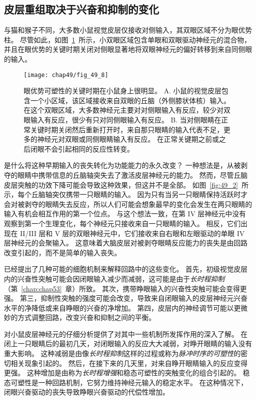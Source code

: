 \subsection{皮层重组取决于兴奋和抑制的变化}

与猫和猴子不同，大多数小鼠视觉皮层仅接收对侧输入，其双眼区域不分为眼优势柱。
尽管如此，如图~\ref{fig:49_8}~所示，小双眼区域包含单眼和双眼驱动神经元的混合物，并且在眼优势的关键时期关闭对侧眼显著地将双眼神经元的偏好转移到来自同侧眼的输入。


\begin{figure}[htbp]
	\centering
	\texttt{[image: chap49/fig\_49\_8]}
	\caption{眼优势可塑性的关键时期在小鼠身上很明显\cite{hensch2005critical}。
		A. 小鼠的视觉皮层包含一个小区域，该区域接收来自双眼的丘脑（外侧膝状体核）输入。
		在这个双眼区域，大多数神经元主要对对侧眼输入有反应，较少对双眼输入有反应，很少有只对同侧眼输入有反应。
		B. 当对侧眼睛在正常关键时期关闭然后重新打开时，来自那只眼睛的输入代表不足，更多的神经元对双眼或同侧眼睛输入有反应。
		在正常关键期之前或之后闭眼不会引起相同的反应性转变。}
	\label{fig:49_8}
\end{figure}


是什么将这种早期输入的丧失转化为功能能力的永久改变？
一种想法是，从被剥夺的眼睛中携带信息的丘脑轴突失去了激活皮层神经元的能力。
然而，尽管丘脑皮层突触的功效下降可能会导致这种效果，但这并不是全部。
如图~\ref{fig:49_2}~所示，每个丘脑轴突仅携带一只眼睛的输入。
因为只有当另一只眼睛保持活跃时才会对被剥夺的眼睛失去反应，所以人们可能会想象最早的变化会发生在两只眼睛的输入有机会相互作用的第一个位点。
与这个想法一致，在第 IV 层神经元中没有观察到第一个生理变化，每个神经元只接收来自一只眼睛的输入。
相反，它们出现在 II/III 层和 V 层的双眼神经元中，它们接收来自右眼和左眼驱动的单眼 IV 层神经元的会聚输入。
这意味着大脑皮层对被剥夺眼睛反应能力的丧失是由回路改变引起的，而不是简单的输入丧失。


已经提出了几种可能的细胞机制来解释回路中的这些变化。
首先，初级视觉皮层内的兴奋性突触可能会因闭眼输入减少而减弱，这可能是由于\textit{长时程抑制}（第~\ref{chap:chap53}~章）所致。
其次，携带睁眼输入的兴奋性突触可能会变得更强。
第三，抑制性突触的强度可能会改变，导致来自闭眼输入的皮层神经元兴奋水平的净降低或来自睁眼的兴奋的净增加。
第四，皮层内的神经调节可能以更微妙的方式调整回路，改变兴奋和抑制之间的平衡。


对小鼠皮层神经元的仔细分析提供了对其中一些机制所发挥作用的深入了解。
在闭上一只眼睛后的最初几天，对闭眼输入的反应大大减弱，对睁开眼睛的输入没有重大影响。
这种减弱是由像\textit{长时程抑制}这样的过程或称为\textit{脉冲时序的可塑性}的密切相关现象引起的。
然后，在接下来的几天里，对来自睁开眼睛输入的反应变得更强。
这种增加是由称为\textit{长时程增强}和稳态可塑性的突触变化的组合引起的。
稳态可塑性是一种回路机制，它努力维持神经元输入的稳定水平。
在这种情况下，闭眼兴奋驱动的丧失导致睁眼兴奋驱动的代偿性增加。


